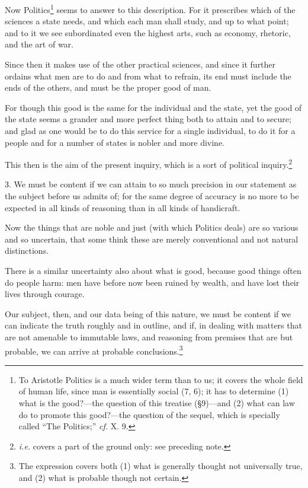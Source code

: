 Now Politics\footnote{To Aristotle Politics is a much wider term than
to us; it covers the whole field of human life, since man is
essentially social (7, 6); it has to determine (1) what is the
good?---the question of this treatise (\S9)---and (2) what can law do
to promote this good?---the question of the sequel, which is specially
called ``The Politics;'' \textit{cf.} X. 9.} seems to answer to this
description.  For it prescribes which of the sciences a state
needs, and which each man shall study, and up to what point; and to it
we see subordinated even the highest arts, such as economy, rhetoric,
and the art of war.

Since then it makes use of the other practical sciences, and since it
further ordains what men are to do and from what to refrain, its end
must include the ends of the others, and must be the proper good of
man.

For though this good is the same for the individual and the state, yet
the good of the state seems a grander and more perfect thing both to
attain and to secure; and glad as one would be to do this service for
a single individual, to do it for a people and for a number of states
is nobler and more divine.

This then is the aim of the present inquiry, which is a sort of
political inquiry.\footnote{\textit{i.e.} covers a part of the ground
only: see preceding note.}

3. We must be content if we can attain to so much precision in our
statement as the subject before us admits of; for the same degree of
accuracy is no more to be expected in all kinds of reasoning than in
all kinds of handicraft.

Now the things that are noble and just (with which Politics deals) are
so various and so uncertain, that some think these are merely
conventional and not natural distinctions.

There is a similar uncertainty also about what is good, because good
things often do people harm: men have before now been ruined by
wealth, and have lost their lives through courage.

Our subject, then, and our data being of this  nature, we must
be content if we can indicate the truth roughly and in outline, and
if, in dealing with matters that are not amenable to immutable laws,
and reasoning from premises that are but probable, we can arrive at
probable conclusions.\footnote{The expression 
covers both (1) what is generally thought not universally true, and
(2) what is probable though not certain.}

